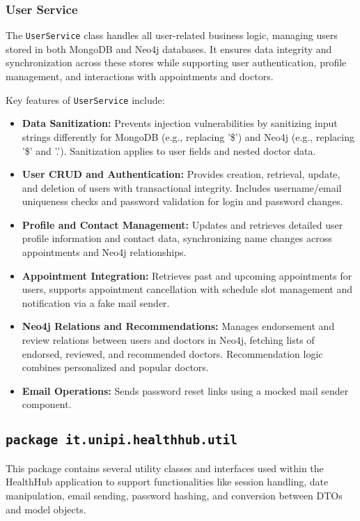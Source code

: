 \subsubsection{User Service}
The \texttt{UserService} class handles all user-related business logic, managing users stored in both MongoDB and Neo4j databases. It ensures data integrity and synchronization across these stores while supporting user authentication, profile management, and interactions with appointments and doctors.

Key features of \texttt{UserService} include:
\begin{itemize}
	\item \textbf{Data Sanitization:} Prevents injection vulnerabilities by sanitizing input strings differently for MongoDB (e.g., replacing '\$') and Neo4j (e.g., replacing '\$' and '.'). Sanitization applies to user fields and nested doctor data.

	\item \textbf{User CRUD and Authentication:} Provides creation, retrieval, update, and deletion of users with transactional integrity. Includes username/email uniqueness checks and password validation for login and password changes.  
	
	\item \textbf{Profile and Contact Management:} Updates and retrieves detailed user profile information and contact data, synchronizing name changes across appointments and Neo4j relationships.  
	
	\item \textbf{Appointment Integration:} Retrieves past and upcoming appointments for users, supports appointment cancellation with schedule slot management and notification via a fake mail sender.  
	
	\item \textbf{Neo4j Relations and Recommendations:} Manages endorsement and review relations between users and doctors in Neo4j, fetching lists of endorsed, reviewed, and recommended doctors. Recommendation logic combines personalized and popular doctors.  
	
	\item \textbf{Email Operations:} Sends password reset links using a mocked mail sender component.  
\end{itemize}

\subsection{\texttt{package it.unipi.healthhub.util}}
This package contains several utility classes and interfaces used within the HealthHub application to support functionalities like session handling, date manipulation, email sending, password hashing, and conversion between DTOs and model objects.

